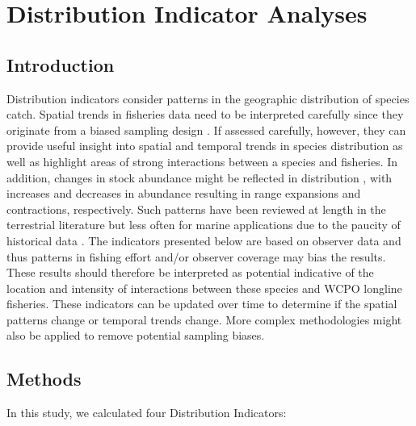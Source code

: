 \documentclass[12pt]{SCreport}
\begin{document}
        
             
        
\section{Distribution Indicator Analyses}
      \subsection{Introduction}

      Distribution indicators consider patterns in the geographic distribution of species catch. Spatial trends in fisheries data need to be interpreted carefully since they originate from a biased sampling design \citep{Walters2003_a}. If assessed carefully, however, they can provide useful insight into spatial and temporal trends in species distribution as well as highlight areas of strong interactions between a species and fisheries. In addition, changes in stock abundance might be reflected in distribution \citep{MacCall1990}, with increases and decreases in abundance resulting in range expansions and contractions, respectively. Such patterns have been reviewed at length in the terrestrial literature \citep{Borregaard2010_a} but less often for marine applications due to the paucity of historical data \citep[but see][]{Worm2011_a}. The indicators presented below are based on observer data and thus patterns in fishing effort and/or observer coverage may bias the results.  These results should therefore be interpreted as potential indicative of the location and intensity of interactions between these species and WCPO longline fisheries.  These indicators can be updated over time to determine if the spatial patterns change or temporal trends change.  More complex methodologies might also be applied to remove potential sampling biases.
      
      
      \subsection{Methods}
      In this study, we calculated four Distribution Indicators:
      
\end{document}
